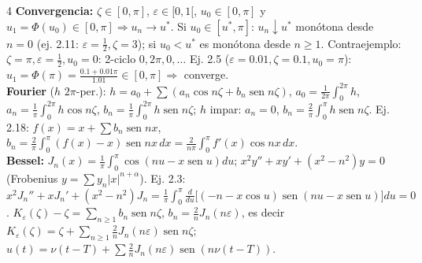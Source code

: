 \documentclass[8pt,a4paper,landscape]{extarticle}
\newcommand{\ab}[1]{\lvert #1\rvert}
\DeclareMathOperator{\sen}{sen}
\begin{document}
\begin{multicols}{4}
\textbf{Convergencia:} $\zeta\in[0,\pi]$, $\varepsilon\in[0,1[$, $u_0\in[0,\pi]$ y $u_1=\Phi(u_0)\in[0,\pi]\Rightarrow u_n\to u^*$. Si $u_0\in[u^*,\pi]$: $u_n\downarrow u^*$ monótona desde $n=0$ (ej. 2.11: $\varepsilon=\frac12,\zeta=3$); si $u_0<u^*$ es monótona desde $n\ge1$. Contraejemplo: $\zeta=\pi,\varepsilon=\frac12,u_0=0$: 2-ciclo $0,2\pi,0,\dots$ Ej. 2.5 ($\varepsilon=0.01,\zeta=0.1,u_0=\pi$): $u_1=\Phi(\pi)=\frac{0.1+0.01\pi}{1.01}\in[0,\pi]\Rightarrow$ converge.\\
\textbf{Fourier} ($h$ $2\pi$-per.): $h=a_0+\sum(a_n\cos n\zeta+b_n\sen n\zeta)$, $a_0=\frac1{2\pi}\!\int_0^{2\pi}\!h$, $a_n=\frac1\pi\!\int_0^{2\pi}\!h\cos n\zeta$, $b_n=\frac1\pi\!\int_0^{2\pi}\!h\sen n\zeta$; $h$ impar: $a_n=0$, $b_n=\frac2\pi\!\int_0^\pi h\sen n\zeta$.
Ej. 2.18: $f(x)=x+\sum b_n\sen nx$, $b_n=\frac2\pi\!\int_0^\pi(f(x)-x)\sen nx\,dx=\frac2{n\pi}\!\int_0^\pi f'(x)\cos nx\,dx$.\\
\textbf{Bessel:} $J_n(x)=\frac1\pi\!\int_0^\pi\!\cos(nu-x\sen u)du$; $x^2y''+xy'+(x^2-n^2)y=0$ (Frobenius $y=\sum y_n\ab x^{n+\alpha}$). Ej. 2.3: $x^2J_n''+xJ_n'+(x^2-n^2)J_n=\frac1\pi\!\int_0^\pi\!\frac{d}{du}\big[(-n-x\cos u)\sen(nu-x\sen u)\big]du=0$.
$K_\varepsilon(\zeta)-\zeta=\sum_{n\ge1}b_n\sen n\zeta$, $b_n=\frac2nJ_n(n\varepsilon)$, es decir
$\boxed{K_\varepsilon(\zeta)=\zeta+\sum_{n\ge1}\frac2nJ_n(n\varepsilon)\sen n\zeta}$; $u(t)=\nu(t-T)+\sum\frac2nJ_n(n\varepsilon)\sen(n\nu(t-T))$.


\end{multicols}
\end{document}
